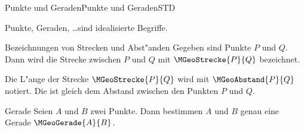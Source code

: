 \begin{MXContent}{Punkte und Geraden}{Punkte und Geraden}{STD}

Punkte, Geraden, \ldots sind idealisierte Begriffe.

\begin{MXInfo}{Bezeichnungen von Strecken und Abst"anden}
Gegeben sind Punkte $P$ und $Q$. Dann wird die Strecke zwischen $P$ und $Q$ mit
$\MGeoStrecke{P}{Q}$ bezeichnet.

Die L"ange der Strecke $\MGeoStrecke{P}{Q}$ wird mit $\MGeoAbstand{P}{Q}$ notiert.
Die  ist gleich dem Abstand zwischen den
Punkten $P$ und $Q$.
\end{MXInfo}

\begin{MXInfo}{Gerade}
Seien $A$ und $B$ zwei Punkte. Dann bestimmen $A$ und $B$ genau eine Gerade 
$\MGeoGerade{A}{B}$.
\end{MXInfo}

\end{MXContent}



